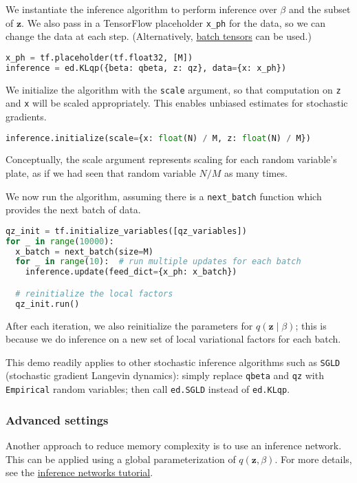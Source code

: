 We instantiate the inference algorithm to perform inference over
$\beta$ and the subset of $\mathbf{z}$.
We also pass in a TensorFlow placeholder \texttt{x_ph} for the data,
so we can change the data at each step. (Alternatively,
\href{/api/data}{batch tensors} can be used.)
\begin{lstlisting}[language=Python]
x_ph = tf.placeholder(tf.float32, [M])
inference = ed.KLqp({beta: qbeta, z: qz}, data={x: x_ph})
\end{lstlisting}
We initialize the algorithm with the \texttt{scale} argument, so that
computation on \texttt{z} and \texttt{x} will be scaled appropriately.
This enables unbiased estimates for stochastic gradients.
\begin{lstlisting}[language=Python]
inference.initialize(scale={x: float(N) / M, z: float(N) / M})
\end{lstlisting}
Conceptually, the scale argument represents scaling for each random
variable’s plate, as if we had seen that random variable $N/M$ as many
times.

We now run the algorithm, assuming there is a \texttt{next_batch}
function which provides the next batch of data.
\begin{lstlisting}[language=Python]
qz_init = tf.initialize_variables([qz_variables])
for _ in range(10000):
  x_batch = next_batch(size=M)
  for _ in range(10):  # run multiple updates for each batch
    inference.update(feed_dict={x_ph: x_batch})

  # reinitialize the local factors
  qz_init.run()
\end{lstlisting}
After each iteration, we also reinitialize the parameters for
$q(\mathbf{z}\mid\beta)$; this is because we do inference on a new
set of local variational factors for each batch.

This demo readily applies to other stochastic inference
algorithms such as \texttt{SGLD} (stochastic gradient Langevin
dynamics): simply
replace \texttt{qbeta} and \texttt{qz} with \texttt{Empirical} random
variables; then call \texttt{ed.SGLD} instead of \texttt{ed.KLqp}.

\subsubsection{Advanced settings}

Another approach to reduce memory complexity is to use an inference
network. This can be applied using a global parameterization of
$q(\mathbf{z}, \beta)$. For more details, see the
\href{/tutorials/inference-networks}{inference networks tutorial}.

